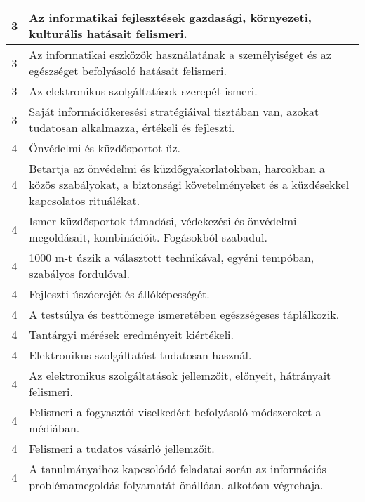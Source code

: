 \begin{longtable}{c | p{12cm} }
                                          3 &  Az informatikai fejlesztések gazdasági, környezeti, kulturális hatásait felismeri. \\ \hline
                                          3 &  Az informatikai eszközök használatának a személyiséget és az egészséget befolyásoló hatásait felismeri. \\ \hline
                                          3 &  Az elektronikus szolgáltatások szerepét ismeri. \\ \hline
                                          3 &  Saját információkeresési stratégiáival tisztában van, azokat tudatosan alkalmazza, értékeli és fejleszti. \\ \hline
                                      
                                
                                          4 &  Önvédelmi és küzdősportot űz. \\ \hline
                                          4 &  Betartja az önvédelmi és küzdőgyakorlatokban, harcokban a közös szabályokat, a biztonsági követelményeket és a küzdésekkel kapcsolatos rituálékat. \\ \hline
                                          4 &  Ismer küzdősportok támadási, védekezési és önvédelmi megoldásait, kombinációit. Fogásokból szabadul. \\ \hline
                                          4 &  1000 m-t  úszik a választott technikával, egyéni tempóban, szabályos fordulóval. \\ \hline
                                          4 &  Fejleszti úszóerejét és állóképességét. \\ \hline
                                          4 &  A testsúlya és testtömege ismeretében egészségeses táplálkozik. \\ \hline
                                          4 &  Tantárgyi mérések eredményeit kiértékeli. \\ \hline
                                          4 &  Elektronikus szolgáltatást tudatosan használ. \\ \hline
                                          4 &  Az elektronikus szolgáltatások jellemzőit, előnyeit, hátrányait felismeri. \\ \hline
                                          4 &  Felismeri a fogyasztói viselkedést befolyásoló módszereket a médiában. \\ \hline
                                          4 &  Felismeri a tudatos vásárló jellemzőit. \\ \hline
                                          4 &  A tanulmányaihoz kapcsolódó feladatai során az információs problémamegoldás folyamatát önállóan, alkotóan végrehaja. \\ \hline
                                      
                        \end{longtable}
            \clearpage

